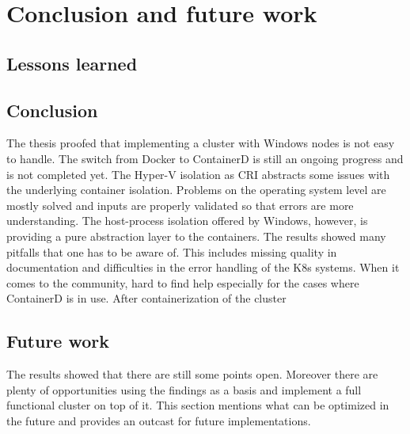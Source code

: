 \chapter{Conclusion and future work} %

\label{chap:conclusion} %



\section{Lessons learned}

\section{Conclusion}
The thesis proofed that implementing a cluster with \ac{Windows} nodes is not easy to handle. The switch from Docker to ContainerD is still an ongoing progress and is not completed yet.
The Hyper-V isolation as \ac{CRI} abstracts some issues with the underlying container isolation. Problems on the operating system level are mostly solved and inputs are properly validated so that errors are more understanding.
The host-process isolation offered by \ac{Windows}, however, is providing a pure abstraction layer to the containers.
The results showed many pitfalls that one has to be aware of. This includes missing quality in documentation and difficulties in the error handling of the \ac{K8s} systems. When it comes to the community, hard to find help especially for the cases where ContainerD is in use.
After containerization of the cluster


\section{Future work}
The results showed that there are still some points open. Moreover there are plenty of opportunities using the findings as a basis and implement a full functional cluster on top of it. This section mentions what can be optimized in the future and provides an outcast for future implementations.


